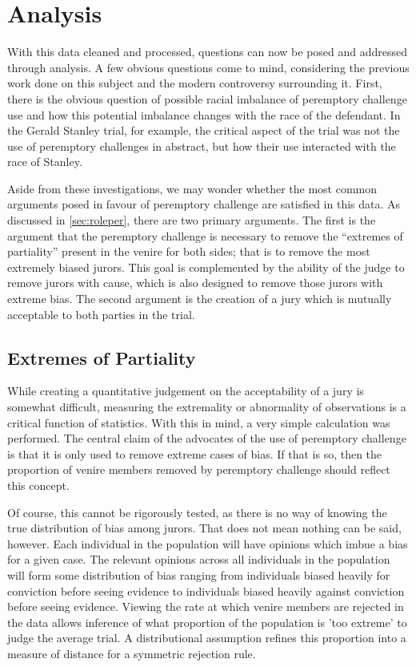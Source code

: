 \chapter{Analysis} \label{c:analysis}

With this data cleaned and processed, questions can now be posed and addressed through analysis. A few obvious questions come to
mind, considering the previous work done on this subject and the modern controversy surrounding it. First, there is the obvious
question of possible racial imbalance of peremptory challenge use and how this potential imbalance changes with the race of the
defendant. In the Gerald Stanley trial, for example, the critical aspect of the trial was not the use of peremptory challenges
in abstract, but how their use interacted with the race of Stanley.

Aside from these investigations, we may wonder whether the most common arguments posed in favour of peremptory challenge are
satisfied in this data. As discussed in \ref{sec:roleper}, there are two primary arguments. The first is the argument that the
peremptory challenge is necessary to remove the ``extremes of partiality'' present in the venire for both sides; that is to remove
the most extremely biased jurors. This goal is complemented by the ability of the judge to remove jurors with cause, which is also
designed to remove those jurors with extreme bias. The second argument is the creation of a jury which is mutually acceptable to
both parties in the trial.

\section{Extremes of Partiality} \label{sec:extremes}

While creating a quantitative judgement on the acceptability of a jury is somewhat difficult, measuring the extremality or
abnormality of observations is a critical function of statistics. With this in mind, a very simple calculation was performed. The
central claim of the advocates of the use of peremptory challenge is that it is only used to remove extreme cases of bias. If that
is so, then the proportion of venire members removed by peremptory challenge should reflect this concept.

Of course, this cannot be rigorously tested, as there is no way of knowing the true distribution of bias among jurors. That does
not mean nothing can be said, however. Each individual in the population will have opinions which imbue a bias for a given
case. The relevant opinions across all individuals in the population will form some distribution of bias ranging from individuals
biased heavily for conviction before seeing evidence to individuals biased heavily against conviction before seeing
evidence. Viewing the rate at which venire members are rejected in the data allows inference of what proportion of the population
is 'too extreme' to judge the average trial. A distributional assumption refines this proportion into a measure of distance for a
symmetric rejection rule.

